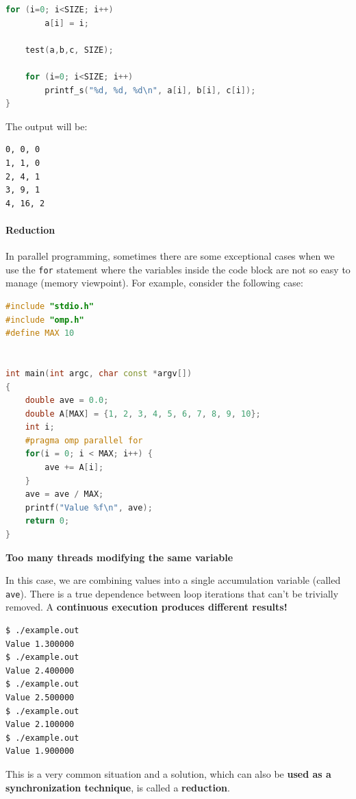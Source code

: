 \begin{itemize}
\begin{examplebox}
\begin{lstlisting}[language=C++]
    for (i=0; i<SIZE; i++)
        a[i] = i;

    test(a,b,c, SIZE);

    for (i=0; i<SIZE; i++)
        printf_s("%d, %d, %d\n", a[i], b[i], c[i]);
}\end{lstlisting}
    The output will be:
\begin{lstlisting}
0, 0, 0
1, 1, 0
2, 4, 1
3, 9, 1
4, 16, 2\end{lstlisting}
    \end{examplebox}
\end{itemize}

\newpage

\paragraph{Reduction}\label{paragraph: Reduction}

\noindent
In parallel programming, sometimes there are some exceptional cases when we use the \texttt{for} statement where the variables inside the code block are not so easy to manage (memory viewpoint). For example, consider the following case:
\begin{center}
\begin{lstlisting}[language=C++]
#include "stdio.h"
#include "omp.h"
#define MAX 10


int main(int argc, char const *argv[])
{
    double ave = 0.0;
    double A[MAX] = {1, 2, 3, 4, 5, 6, 7, 8, 9, 10};
    int i;
    #pragma omp parallel for
    for(i = 0; i < MAX; i++) {
        ave += A[i];
    }
    ave = ave / MAX;
    printf("Value %f\n", ave);
    return 0;
}
\end{lstlisting}
\textcolor{Red2}{ \textbf{Too many threads modifying the same variable}}
\end{center}
In this case, we are combining values into a single accumulation variable (called \texttt{ave}). There is a true dependence between loop iterations that can't be trivially removed. A \textbf{continuous execution produces different results!}
\begin{lstlisting}[language=bash, mathescape=false]
$ ./example.out
Value 1.300000
$ ./example.out
Value 2.400000
$ ./example.out 
Value 2.500000
$ ./example.out 
Value 2.100000
$ ./example.out 
Value 1.900000    
\end{lstlisting}
This is a very common situation and a solution, which can also be \textbf{used as a synchronization technique}, is called a \textbf{reduction}.

